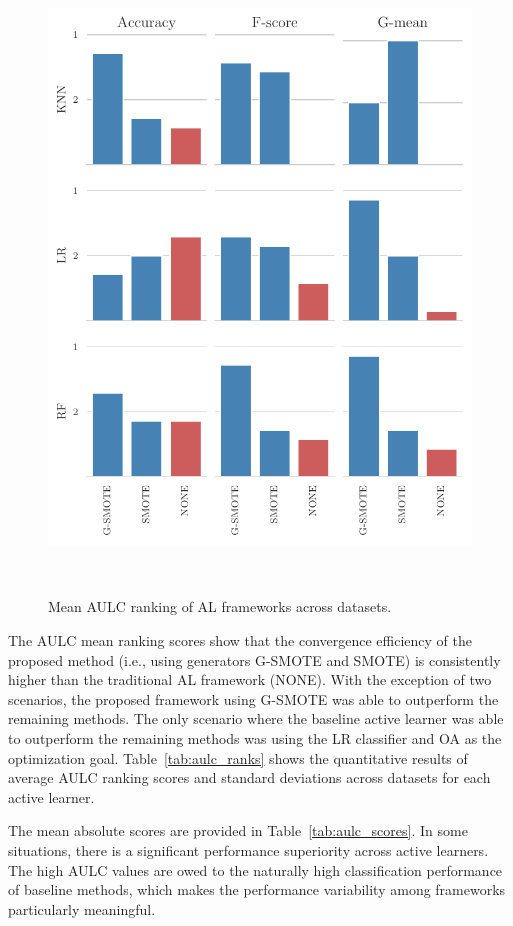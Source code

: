 \documentclass[parskip=full]{scrartcl}
\begin{document}
\begin{figure}[H]
	\centering
	\includegraphics[width=.6\linewidth]{../analysis/mean_rankings_bar_chart}
    \caption{Mean AULC ranking of AL frameworks across datasets.}~\label{fig:aulc_ranks}
\end{figure}

The AULC mean ranking scores show that the convergence efficiency of the
proposed method (i.e., using generators G-SMOTE and SMOTE) is consistently
higher than the traditional AL framework (NONE). With the exception of two
scenarios, the proposed framework using G-SMOTE was able to outperform the
remaining methods. The only scenario where the baseline active learner was able
to outperform the remaining methods was using the LR classifier and OA as the
optimization goal. Table~\ref{tab:aulc_ranks} shows the quantitative results of
average AULC ranking scores and standard deviations across datasets for each
active learner.


The mean absolute scores are provided in Table~\ref{tab:aulc_scores}. In some
situations, there is a significant performance superiority across active
learners. The high AULC values are owed to the naturally high classification
performance of baseline methods, which makes the performance variability among
frameworks particularly meaningful. 
\end{document}
